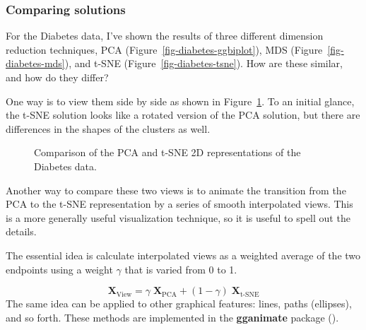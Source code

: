 \documentclass[
  letterpaper,
  10pt,
  krantz2]{krantz}
\begin{document}
\subsubsection{Comparing solutions}\label{compare-solutions}

For the Diabetes data, I've shown the results of three different
dimension reduction techniques, PCA
(Figure~\ref{fig-diabetes-ggbiplot}), MDS
(Figure~\ref{fig-diabetes-mds}), and t-SNE
(Figure~\ref{fig-diabetes-tsne}). How are these similar, and how do they
differ?

One way is to view them side by side as shown in
Figure~\ref{fig-diabetes-pca-tsne}. To an initial glance, the t-SNE
solution looks like a rotated version of the PCA solution, but there are
differences in the shapes of the clusters as well.

\begin{figure}


\caption{\label{fig-diabetes-pca-tsne}Comparison of the PCA and t-SNE 2D
representations of the Diabetes data.}

\end{figure}%

Another way to compare these two views is to animate the transition from
the PCA to the t-SNE representation by a series of smooth interpolated
views. This is a more generally useful visualization technique, so it is
useful to spell out the details.

The essential idea is calculate interpolated views as a weighted average
of the two endpoints using a weight \(\gamma\) that is varied from 0 to
1.

\[
\mathbf{X}_{\text{View}} = \gamma \;\mathbf{X}_{\text{PCA}} + (1-\gamma) \;\mathbf{X}_{\text{t-SNE}}
\] The same idea can be applied to other graphical features: lines,
paths (ellipses), and so forth. These methods are implemented in the
\textbf{gganimate} package ().
\end{document}
